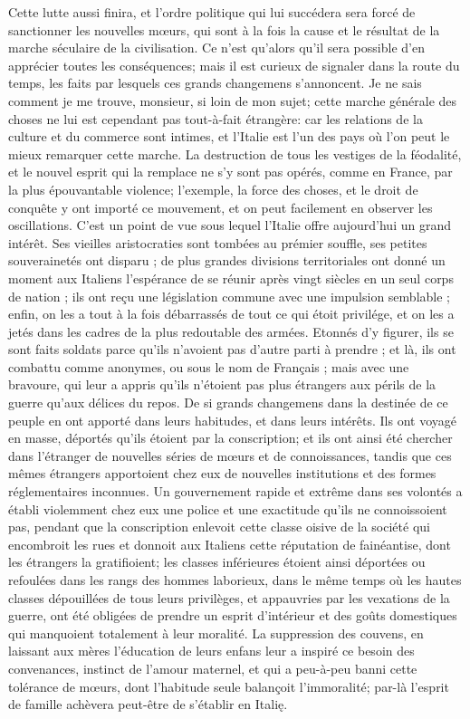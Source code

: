 Cette lutte aussi finira, et l'ordre politique qui lui succédera sera forcé de sanctionner les nouvelles mœurs, qui sont à la fois la cause et le résultat de la marche séculaire de la civilisation. Ce n'est qu'alors qu'il sera possible d'en apprécier toutes les conséquences; mais il est curieux de signaler dans la route du temps, les faits par lesquels ces grands changemens s'annoncent.
Je ne sais comment je me trouve, monsieur, si loin de mon sujet; cette marche générale des choses ne lui est cependant pas tout-à-fait étrangère: car les relations de la culture et du commerce sont intimes, et l'Italie est l'un des pays où l'on peut le mieux remarquer cette marche. La destruction\setcounter{page}{367} de tous les vestiges de la féodalité, et le nouvel esprit qui la remplace ne s'y sont pas opérés, comme en France, par la plus épouvantable violence; l'exemple, la force des choses, et le droit de conquête y ont importé ce mouvement, et on peut facilement en observer les oscillations. C'est un point de vue sous lequel l'Italie offre aujourd'hui un grand intérêt.
Ses vieilles aristocraties sont tombées au prémier souffle, ses petites souverainetés ont disparu ; de plus grandes divisions territoriales ont donné un moment aux Italiens l'espérance de se réunir après vingt siècles en un seul corps de nation ; ils ont reçu une législation commune avec une impulsion semblable ; enfin, on les a tout à la fois débarrassés de tout ce qui étoit privilége, et on les a jetés dans les cadres de la plus redoutable des armées. Etonnés d'y figurer, ils se sont faits soldats parce qu'ils n'avoient pas d'autre parti à prendre ; et là, ils ont combattu comme anonymes, ou sous le nom de Français ; mais avec une bravoure, qui leur a appris qu'ils n'étoient pas plus étrangers aux périls de la guerre qu'aux délices du repos.
De si grands changemens dans la destinée de ce peuple en ont apporté dans leurs habitudes, et dans leurs intérêts. Ils ont voyagé\setcounter{page}{368} en masse, déportés qu'ils étoient par la conscription; et ils ont ainsi été chercher dans l'étranger de nouvelles séries de mœurs et de connoissances, tandis que ces mêmes étrangers apportoient chez eux de nouvelles institutions et des formes réglementaires inconnues. Un gouvernement rapide et extrême dans ses volontés a établi violemment chez eux une police et une exactitude qu'ils ne connoissoient pas, pendant que la conscription enlevoit cette classe oisive de la société qui encombroit les rues et donnoit aux Italiens cette réputation de fainéantise, dont les étrangers la gratifioient; les classes inférieures étoient ainsi déportées ou refoulées dans les rangs des hommes laborieux, dans le même temps où les hautes classes dépouillées de tous leurs privilèges, et appauvries par les vexations de la guerre, ont été obligées de prendre un esprit d'intérieur et des goûts domestiques qui manquoient totalement à leur moralité. La suppression des couvens, en laissant aux mères l'éducation de leurs enfans leur a inspiré ce besoin des convenances, instinct de l'amour maternel, et qui a peu-à-peu banni cette tolérance de mœurs, dont l'habitude seule balançoit l'immoralité; par-là l'esprit de famille achèvera peut-être de s'établir en Italię.
